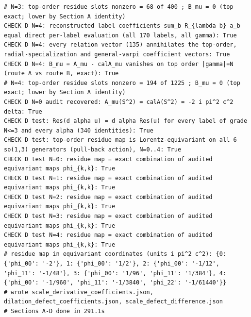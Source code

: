 \documentclass{article}
\theoremstyle{remark}
\begin{document}
\begin{lstlisting}
# N=3: top-order residue slots nonzero = 68 of 400 ; B_mu = 0 (top exact; lower by Section A identity)
CHECK D N=4: reconstructed label coefficients sum_b R_{lambda b} a_b equal direct per-label evaluation (all 170 labels, all gamma): True
CHECK D N=4: every relation vector (135) annihilates the top-order, radial-specialization and general-varpi coefficient vectors: True
CHECK D N=4: B_mu = A_mu - calA_mu vanishes on top order |gamma|=N (route A vs route B, exact): True
# N=4: top-order residue slots nonzero = 194 of 1225 ; B_mu = 0 (top exact; lower by Section A identity)
CHECK D N=0 audit recovered: A_mu(S^2) = calA(S^2) = -2 i pi^2 c^2 delta: True
CHECK D test: Res(d_alpha u) = d_alpha Res(u) for every label of grade N<=3 and every alpha (340 identities): True
CHECK D test: top-order residue map is Lorentz-equivariant on all 6 so(1,3) generators (pull-back action), N=0..4: True
CHECK D test N=0: residue map = exact combination of audited equivariant maps phi_{k,k}: True
CHECK D test N=1: residue map = exact combination of audited equivariant maps phi_{k,k}: True
CHECK D test N=2: residue map = exact combination of audited equivariant maps phi_{k,k}: True
CHECK D test N=3: residue map = exact combination of audited equivariant maps phi_{k,k}: True
CHECK D test N=4: residue map = exact combination of audited equivariant maps phi_{k,k}: True
# residue map in equivariant coordinates (units i pi^2 c^2): {0: {'phi_00': '-2'}, 1: {'phi_00': '1/2'}, 2: {'phi_00': '-1/12', 'phi_11': '-1/48'}, 3: {'phi_00': '1/96', 'phi_11': '1/384'}, 4: {'phi_00': '-1/960', 'phi_11': '-1/3840', 'phi_22': '-1/61440'}}
# wrote scale_derivative_coefficients.json, dilation_defect_coefficients.json, scale_defect_difference.json
# Sections A-D done in 291.1s


\end{lstlisting}
\end{document}
